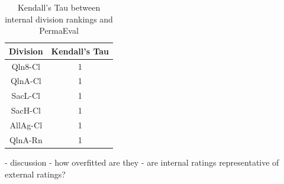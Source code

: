\begin{table}[H]
\centering
\begin{tabular}{|| c | c ||} 
 \hline
 Division & Kendall's Tau \\ [0.5ex] 
 \hline\hline
     Qln8-Cl & 1 \\
     QlnA-Cl & 1 \\
     SacL-Cl & 1 \\
     SacH-Cl & 1 \\
     AllAg-Cl & 1 \\
     QlnA-Rn & 1 \\ [1ex] 
 \hline
\end{tabular}
\label{DivisionInternalExternal}
\caption{Kendall's Tau between internal division rankings and PermaEval}
\end{table}

\begin{code}
    - discussion
    - how overfitted are they
    - are internal ratings representative of external ratings?
\end{code}

